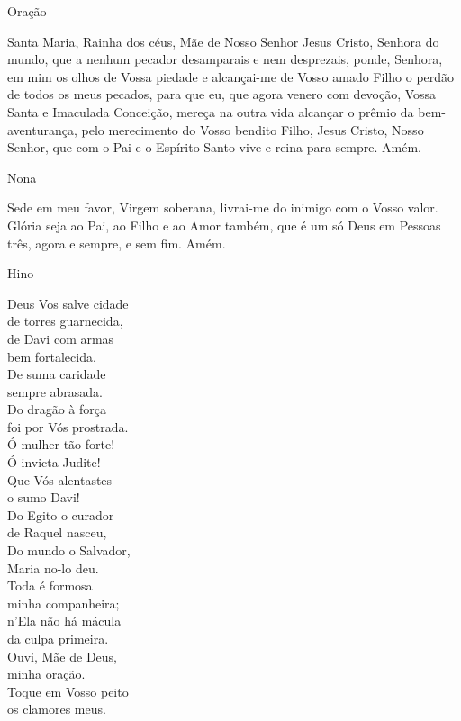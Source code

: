\documentclass{book}
\begin{document}
\begin{center}
    \textcolor{VioletRed2}{Oração}
\end{center}
\begin{flushleft}
    Santa Maria, Rainha dos céus, Mãe de Nosso Senhor Jesus Cristo, Senhora do mundo, que a nenhum pecador desamparais e nem desprezais, ponde, Senhora, em mim os olhos de Vossa piedade e alcançai-me de Vosso amado Filho o perdão de todos os meus pecados, para que eu, que agora venero com devoção, Vossa Santa e Imaculada Conceição, mereça na outra vida alcançar o prêmio da bem-aventurança, pelo merecimento do Vosso bendito Filho, Jesus Cristo, Nosso Senhor, que com o Pai e o Espírito Santo vive e reina para sempre. Amém.
\end{flushleft}
\newpage
\begin{center}
    Nona
\end{center}
\begin{flushleft}
    Sede em meu favor, Virgem soberana, livrai-me do inimigo com o Vosso valor. Glória seja ao Pai, ao Filho e ao Amor também, que é um só Deus em Pessoas três, agora e sempre, e sem fim. Amém.
\end{flushleft}
\begin{center}
    \textcolor{VioletRed2}{Hino}
\end{center}
\begin{multicols}{2}
    Deus Vos salve cidade \\
    de torres guarnecida, \\
    de Davi com armas \\
    bem fortalecida.
    \vspace{.2cm} \\
    De suma caridade \\
    sempre abrasada. \\
    Do dragão à força \\
    foi por Vós prostrada.
    \vspace{.2cm} \\
    Ó mulher tão forte! \\
    Ó invicta Judite! \\
    Que Vós alentastes \\
    o sumo Davi!
    \vspace{.2cm} \\
    Do Egito o curador \\
    de Raquel nasceu, \\
    Do mundo o Salvador, \\
    Maria no-lo deu.
    \vspace{.2cm} \\
    Toda é formosa \\
    minha companheira; \\
    n'Ela não há mácula \\
    da culpa primeira.
    \vspace{.2cm} \\
    Ouvi, Mãe de Deus, \\
    minha oração. \\
    Toque em Vosso peito \\
    os clamores meus.
\end{multicols}
\end{document}
